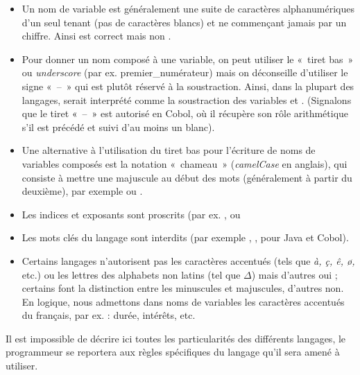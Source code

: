			\begin{itemize}
			\item 
				Un nom de variable est généralement une suite de caractères
				alphanumériques d’un seul tenant (pas de caractères blancs) et ne
				commençant jamais par un chiffre. Ainsi  est
				correct mais non . 
			\item 
				Pour donner un nom composé à une variable, on peut utiliser le «~tiret
				bas~» ou \textit{underscore} (par ex. premier\_numérateur) mais on
				déconseille d’utiliser le signe «~–~» qui est plutôt réservé à la
				soustraction. Ainsi, dans la plupart des langages,
				 serait interprété comme la
				soustraction des variables  et
				. (Signalons que le tiret 
				\textcolor{black}{«~–~»} est autorisé en Cobol, où il récupère son rôle
				arithmétique s’il est précédé et suivi d’au moins un blanc).
			\item 
				Une alternative à l’utilisation du tiret bas pour l’écriture de noms de
				variables composés est la notation «~chameau~» (\textit{camelCase} en
				anglais), qui consiste à mettre une majuscule au début des mots
				(généralement à partir du deuxième), par exemple
				 ou
				.
			\item
				Les indices et exposants sont proscrits (par ex.
				,
				 ou
			\item
				Les mots clés du langage sont interdits (par exemple
				, , pour
				Java et Cobol).
			\item
				Certains langages n’autorisent pas les caractères accentués (tels que
				\textit{à, ç, ê, ø,} etc.) ou les lettres des alphabets non latins
				(tel que ${\Delta}$) mais d’autres oui ; certains font la distinction
				entre les minuscules et majuscules, d’autres non. En logique, nous
				admettons dans noms de variables les caractères accentués du français,
				par ex. : durée, intérêts, etc.
			\end{itemize}

			Il est impossible de décrire ici toutes les particularités des
			différents langages, le programmeur se reportera aux règles spécifiques
			du langage qu’il sera amené à utiliser.

